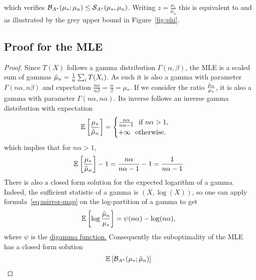 \begin{subappendices}
which verifies ${\mathcal B}_{A^*}( \mu_*; \mu_n) \leq {\mathcal S}_{{A^*}} (\mu_*, \mu_n )$.
Writing $z=\frac{\mu_*}{\mu_n}$ this is equivalent to
and as illustrated by the grey upper bound in Figure~\ref{fig:phi}.



\subsection{Proof for the MLE}
	\label{app:gammaMLE}
	
	\begin{proof}
	Since $T(X)$ follows a gamma distribution $\Gamma(\alpha, \beta)$, the MLE is a scaled sum of gammas $\hat \mu_n = \frac{1}{n} \sum_i T(X_i)$.
	As such it is also a gamma with parameter $\Gamma(n \alpha, n \beta)$ and expectation $\frac{n\alpha}{n\beta} = \frac{\alpha}{\beta} = \mu_*$.
	If we consider the ratio $\frac{\hat {\mu}_n}{\mu_*}$, it is also a gamma with parameter $\Gamma(n \alpha, n \alpha)$.
	Its inverse follows an inverse gamma distribution with expectation
	\begin{equation}
		\mathbb{E}_{} \left[ \frac{\mu_*}{\hat \mu_n} \right]  
		= \begin{cases}
			\frac{n\alpha}{n \alpha -1 }\ \text{ if } n\alpha > 1, \\
			+\infty \  \text{ otherwise. }
		\end{cases}
	\end{equation}
	which implies that for $n\alpha>1$, 
	\begin{align}
		\mathbb{E}_{} \left[ \frac{\mu_*}{\hat \mu_n} \right]  -1  
		= \frac{n \alpha}{n\alpha -1 } - 1
		= \frac{1}{n \alpha -1}
	\end{align}
	There is also a closed form solution for the expected logarithm of a gamma.
	Indeed, the sufficient statistic of a gamma is $(X, \log(X))$, so one can apply formula~\eqref{eq:mirror-map} on the log-partition of a gamma to get
	\begin{align}
		\mathbb{E}_{} \left[ \log \frac{\hat \mu_n}{\mu_*} \right]  
		= \psi(n \alpha) - \log(n \alpha),
	\end{align}
	where $\psi$ is the \href{https://en.wikipedia.org/wiki/Digamma_function}{digamma function.}
	Consequently the suboptimality of the MLE has a closed form solution
	\begin{align}
	\expect{\bregmanconj( \mu_*; \hat \mu_n) }

\end{align}
\end{proof}
\end{subappendices}
